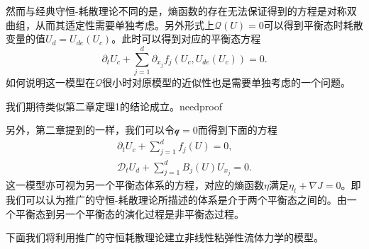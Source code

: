 \documentclass{article}
\begin{document}
然而与经典守恒-耗散理论不同的是，熵函数的存在无法保证得到的方程是对称双曲组，从而其适定性需要单独考虑。另外形式上$\mathcal{Q}(U)=0$可以得到平衡态时耗散变量的值$U_d = U_{de}(U_c)$。此时可以得到对应的平衡态方程
\begin{equation*}
	\partial_t U_c +　\sum_{j=1}^d \partial_{x_j} f_j(U_c,U_{de}(U_c))=0.
\end{equation*}
如何说明这一模型在$\mathcal{Q}$很小时对原模型的近似性也是需要单独考虑的一个问题。

我们期待类似第二章定理1的结论成立。needproof

另外，第二章提到的一样，我们可以令$\mathcal{q}=0$而得到下面的方程
\begin{eqnarray*}
	\partial_t U_c + \sum_{j=1}^d f_j(U) = 0, \\
	\mathcal{D}_t U_d + \sum_{j=1}^d B_j(U) U_{x_j} = 0.	
\end{eqnarray*}
这一模型亦可视为另一个平衡态体系的方程，对应的熵函数$\eta$满足$\eta_t + \nabla J = 0$。即我们可以认为推广的守恒-耗散理论所描述的体系是介于两个平衡态之间的。由一个平衡态到另一个平衡态的演化过程是非平衡态过程\cite{}。

下面我们将利用推广的守恒耗散理论建立非线性粘弹性流体力学的模型。
\end{document}

